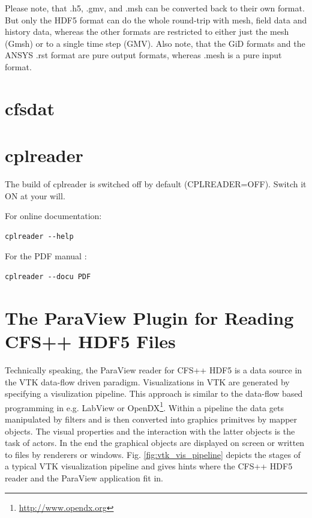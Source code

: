 \noindent Please note, that .h5, .gmv, and .msh can be converted back to their
own format.  But  only the HDF5 format can do the  whole round-trip with mesh,
field  data and  history data,  whereas the  other formats  are  restricted to
either just the  mesh (Gmsh) or to  a single time step (GMV).  Also note, that
the GiD  formats and the  ANSYS .rst format  are pure output  formats, whereas
.mesh is a pure input format.

\section{cfsdat}
\label{sec:cfsdat}


\section{cplreader}
\label{sec:cplreader}

The build of  cplreader is switched off by  default (CPLREADER=OFF). Switch it
ON at your will.

\noindent For online documentation:
\begin{verbatim}
cplreader --help
\end{verbatim}

\noindent For the PDF manual \cite{cplreadermanual}:
\begin{verbatim}
cplreader --docu PDF
\end{verbatim}

\newpage
\section{The ParaView Plugin for Reading CFS++ HDF5 Files}
 \label{sec:paraview_hdf5_plugin}

Technically speaking, the  ParaView reader for CFS++ HDF5 is  a data source in
the VTK  data-flow driven  paradigm.  Visualizations in  VTK are  generated by
specifying a visulization pipeline.  This approach is similar to the data-flow
based         programming          in         e.g.          LabView         or
OpenDX\footnote{\url{http://www.opendx.org}}. Within a  pipeline the data gets
manipulated by filters and is then converted into graphics primitves by mapper
objects. The visual properties and  the interaction with the latter objects is
the task of  actors. In the end the graphical objects  are displayed on screen
or      written      to      files      by     renderers      or      windows.
Fig.   \ref{fig:vtk_vis_pipeline}  depicts  the  stages  of  a  typical  VTK
visualization pipeline  and gives  hints where the  CFS++ HDF5 reader  and the
ParaView application fit in.

